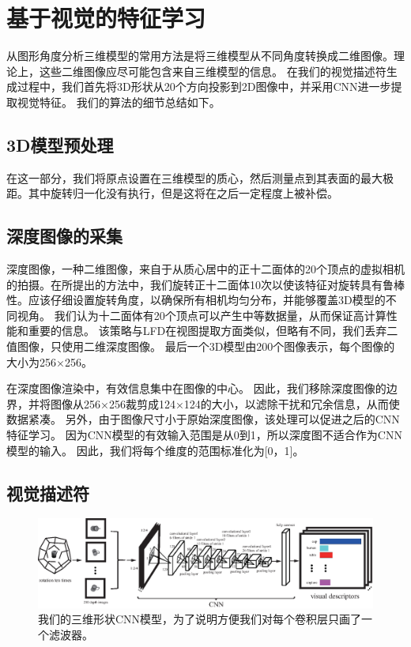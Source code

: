\section{基于视觉的特征学习}

从图形角度分析三维模型的常用方法是将三维模型从不同角度转换成二维图像。理论上，这些二维图像应尽可能包含来自三维模型的信息。 在我们的视觉描述符生成过程中，我们首先将3D形状从20个方向投影到2D图像中，并采用CNN进一步提取视觉特征。 我们的算法的细节总结如下。

\subsection{3D模型预处理}
在这一部分，我们将原点设置在三维模型的质心，然后测量点到其表面的最大极距。其中旋转归一化没有执行，但是这将在之后一定程度上被补偿。

\subsection{深度图像的采集}

深度图像，一种二维图像，来自于从质心居中的正十二面体的20个顶点的虚拟相机的拍摄。在所提出的方法中，我们旋转正十二面体10次以使该特征对旋转具有鲁棒性。应该仔细设置旋转角度，以确保所有相机均匀分布，并能够覆盖3D模型的不同视角。 我们认为十二面体有20个顶点可以产生中等数据量，从而保证高计算性能和重要的信息。 该策略与LFD在视图提取方面类似，但略有不同，我们丢弃二值图像，只使用二维深度图像。 最后一个3D模型由200个图像表示，每个图像的大小为256×256。

在深度图像渲染中，有效信息集中在图像的中心。 因此，我们移除深度图像的边界，并将图像从256×256裁剪成124×124的大小，以滤除干扰和冗余信息，从而使数据紧凑。 另外，由于图像尺寸小于原始深度图像，该处理可以促进之后的CNN特征学习。 因为CNN模型的有效输入范围是从0到1，所以深度图不适合作为CNN模型的输入。 因此，我们将每个维度的范围标准化为[0，1]。

\subsection{视觉描述符}

\begin{figure}[htbp]
\begin{center}
\includegraphics[width=0.98\linewidth]{figures/view_cnn7}
\end{center} 
\vspace{-4mm}
\caption{我们的三维形状CNN模型，为了说明方便我们对每个卷积层只画了一个滤波器。} \label{fig_CNN_view}
\end{figure}

